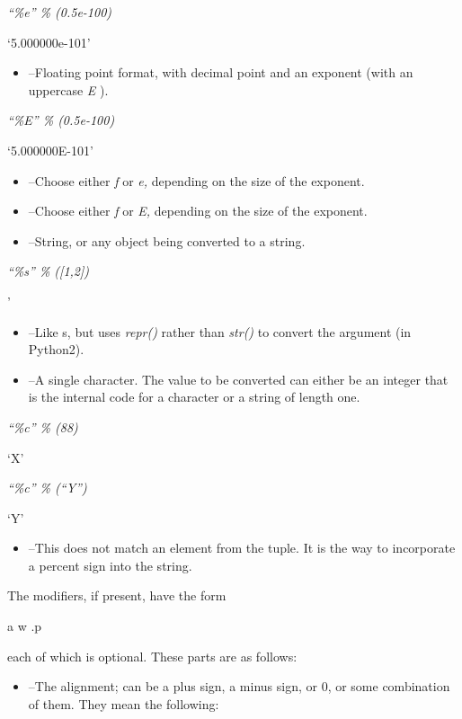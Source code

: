 \emph{``\%e'' \% (0.5e-100)}

`5.000000e-101'

\begin{itemize}

\item
   --Floating point
  format, with decimal point and an exponent (with an uppercase \emph{E}
  ).
\end{itemize}


\emph{``\%E'' \% (0.5e-100)}

`5.000000E-101'

\begin{itemize}

\item
   --Choose either
  \emph{f} or \emph{e,} depending on the size of the exponent.
\item
   --Choose either
  \emph{f} or \emph{E,} depending on the size of the exponent.
\item
   --String, or any object
  being converted to a string.
\end{itemize}


\emph{``\%s'' \% ({[}1,2{]})}

'

\begin{itemize}

\item
   --Like s, but uses
  \emph{repr()} rather than \emph{str()} to convert the argument (in
  Python2).
\item
   --A single character.
  The value to be converted can either be an integer that is the
  internal code for a character or a string of length one.
\end{itemize}


\emph{``\%c'' \% (88)}

`X'


\emph{``\%c'' \% (``Y'')}

`Y'

\begin{itemize}

\item
   --This does not match
  an element from the tuple. It is the way to incorporate a percent sign
  into the string.
\end{itemize}

The modifiers, if present, have the
form

a w .p

each of which is optional. These
parts are as follows:

\begin{itemize}

\item
   --The alignment; can be
  a plus sign, a minus sign, or 0, or some combination of them. They
  mean the following:
\end{itemize}

